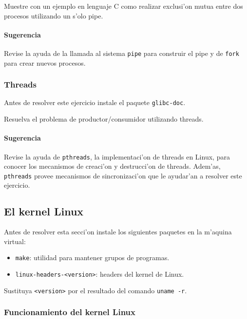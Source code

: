 Muestre con un ejemplo en lenguaje C como realizar exclusi'on mutua entre dos procesos utilizando un s'olo pipe.

\paragraph{Sugerencia}

Revise la ayuda de la llamada al sistema \texttt{pipe} para construir el pipe y de \texttt{fork} para crear
nuevos procesos.

\subsubsection{Threads}

Antes de resolver este ejercicio instale el paquete \texttt{glibc-doc}.

Resuelva el problema de productor/consumidor utilizando threads.

\paragraph{Sugerencia}

Revise la ayuda de \texttt{pthreads}, la implementaci'on de threads en Linux, para conocer los mecanismos de creaci'on y
destrucci'on de threads. Adem'as, \texttt{pthreads} provee mecanismos de sincronizaci'on que le ayudar'an a resolver este
ejercicio.

\subsection{El kernel Linux}

Antes de resolver esta secci'on instale los siguientes paquetes en la m'aquina virtual:

\begin{itemize}
\item \texttt{make}: utilidad para mantener grupos de programas.
\item \texttt{linux-headers-<version>}: headers del kernel de Linux.
\end{itemize}

Sustituya \texttt{<version>} por el resultado del comando \texttt{uname -r}.

\subsubsection{Funcionamiento del kernel Linux}

